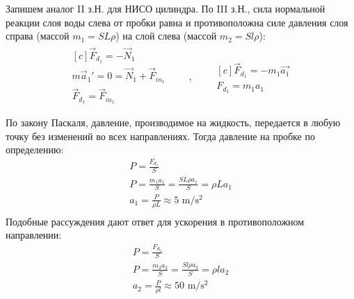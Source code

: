 \documentclass[a5paper,10pt]{article}
\begin{document}
Запишем аналог II з.Н. для НИСО цилиндра. По III з.Н., сила нормальной реакции слоя воды слева от пробки равна и противоположна силе давления слоя справа (массой $m_1=SL\rho$) на слой слева (массой $m_2=Sl\rho$):
\begin{gather*}
    \begin{aligned}[c]
    	\vec{F}_{d_1}=-\vec{N}_{1}\\
        m\vec{a}_1'=0=\vec{N}_1+\vec{F}_{in_1}\\
        \vec{F}_{d_1}=\vec{F}_{in_1}\\
    \end{aligned}
        \qquad,\qquad
    \begin{aligned}[c]
         \vec{F}_{d_1}=-m_1\vec{a_1}\\
        {F}_{d_1}=m_1a_1       
    \end{aligned}\\
\end{gather*}
По закону Паскаля, давление, производимое на жидкость, передается в любую точку без изменений во всех направлениях. Тогда давление на пробке по определению:
\begin{gather*}
	P=\frac{F_{d_1}}{S}\\
        P=\frac{m_1a_1}{S}=\frac{SL\rho{a_1}}{S}=\rho{La_1}\\
        a_1=\frac{P}{\rho{L}}\approx5\text{ m/s$^2$}\\
\end{gather*}
Подобные рассуждения дают ответ для ускорения в противоположном направлении: 
\begin{gather*}
	P=\frac{F_{d_2}}{S}\\
        P=\frac{m_2a_2}{S}=\frac{Sl\rho{a_2}}{S}=\rho{la_2}\\
        a_2=\frac{P}{\rho{l}}\approx50\text{ m/s$^2$}\\
\end{gather*}
\end{document}
